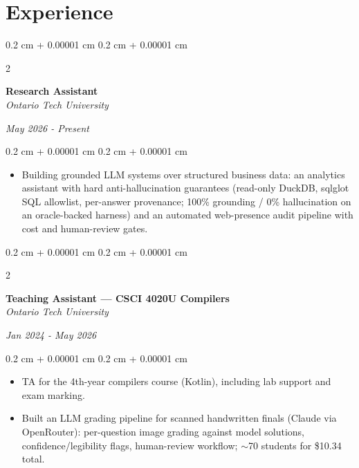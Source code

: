 \documentclass[10pt, letterpaper]{article}
\newenvironment{highlights}{
    \begin{itemize}[
        topsep=0.10 cm,
        parsep=0.10 cm,
        partopsep=0pt,
        itemsep=0pt,
        leftmargin=0.4 cm + 10pt
    ]
}{
    \end{itemize}
} %
\newenvironment{onecolentry}{
    \begin{adjustwidth}{
        0.2 cm + 0.00001 cm
    }{
        0.2 cm + 0.00001 cm
    }
}{
    \end{adjustwidth}
} %
\newenvironment{twocolentry}[2][]{
    \onecolentry
    \def\secondColumn{#2}
    \setcolumnwidth{\fill, 4.5 cm}
    \begin{paracol}{2}
}{
    \switchcolumn \raggedleft \secondColumn
    \end{paracol}
    \endonecolentry
} %
\begin{document}
\section{Experience}
\begin{twocolentry}{
\textit{May 2026 - Present}}
    \textbf{Research Assistant}\\
    \textit{Ontario Tech University}
\end{twocolentry}
\vspace{0.10 cm}
\begin{onecolentry}
    \begin{highlights}
        \item Building grounded LLM systems over structured business data: an analytics assistant with hard anti-hallucination guarantees (read-only DuckDB, sqlglot SQL allowlist, per-answer provenance; 100\% grounding / 0\% hallucination on an oracle-backed harness) and an automated web-presence audit pipeline with cost and human-review gates.
    \end{highlights}
\end{onecolentry}

\vspace{0.2 cm}
\begin{twocolentry}{
\textit{Jan 2024 - May 2026}}
    \textbf{Teaching Assistant --- CSCI 4020U Compilers}\\
    \textit{Ontario Tech University}
\end{twocolentry}
\vspace{0.10 cm}
\begin{onecolentry}
    \begin{highlights}
        \item TA for the 4th-year compilers course (Kotlin), including lab support and exam marking.
        \item Built an LLM grading pipeline for scanned handwritten finals (Claude via OpenRouter): per-question image grading against model solutions, confidence/legibility flags, human-review workflow; $\sim$70 students for \$10.34 total.
    \end{highlights}
\end{onecolentry}
\end{document}
